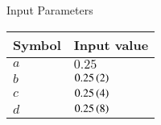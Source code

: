 \setlength{\arrayrulewidth}{0.3mm}
\setlength{\tabcolsep}{12pt}
\renewcommand{\arraystretch}{1.3}


\begin{center}
\caption{Input Parameters}
\begin{tabular}{ |p{2.0cm}|p{2.0cm}| }

\hline
 {Symbol}&{Input value}\\
\hline
$a $ & $0.25$ \\
\hline
$b $ & $0.25 \left(2\right)$ \\
\hline
$c $ & $0.25 \left(4\right)$ \\
\hline
$d $ & $0.25 \left(8\right)$ \\
\hline

\end{tabular}
\end{center}
